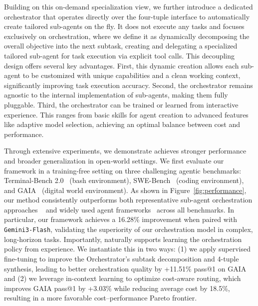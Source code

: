 Building on this on-demand specialization view, we further introduce a dedicated orchestrator that operates directly over the four-tuple interface to automatically create tailored sub-agents on the fly. It does not execute any tasks and focuses exclusively on orchestration, where we define it as dynamically decomposing the overall objective into the next subtask, creating and delegating a specialized tailored sub-agent for task execution via explicit tool calls.
This decoupling design offers several key advantages. 
First, this dynamic creation allows each sub-agent to be customized with unique capabilities and a clean working context, significantly improving task execution accuracy. 
Second, the orchestrator remains agnostic to the internal implementation of sub-agents, making them fully pluggable. 
Third, the orchestrator can be trained or learned from interactive experience.  
This ranges from basic skills for agent creation to advanced features like adaptive model selection, achieving an optimal balance between cost and performance.

Through extensive experiments, we demonstrate \our{} achieves stronger performance and broader generalization in open‑world settings.
We first evaluate our framework in a training-free setting on three challenging agentic benchmarks: Terminal-Bench 2.0~\cite{tbench_2025} (bash environment), SWE-Bench~\cite{jimenez2023swe} (coding environment), and GAIA~\cite{mialon2023gaia} (digital world environment). As shown in Figure~\ref{fig:performance}, our method consistently outperforms both representative sub-agent orchestration approaches ~\cite{anthropic_claude_code_subagents} and widely used agent frameworks~\cite{wang2024openhands, yang2024sweagent} across all benchmarks. In particular, our framework achieves a 16.28\% improvement when paired with \texttt{Gemini3-Flash}, validating the superiority of our orchestration model in complex, long-horizon tasks. 
% 
Importantly, \our naturally supports learning the orchestration policy from experience.
We instantiate this in two ways: (1) we apply supervised fine-tuning to improve the Orchestrator's subtask decomposition and 4-tuple synthesis, leading to better orchestration quality by +11.51\% pass@1 on GAIA and
(2) we leverage in-context learning to optimize cost-aware routing, which improves GAIA pass@1 by +3.03\% while reducing average cost by 18.5\%, resulting in a more favorable cost--performance Pareto frontier.

